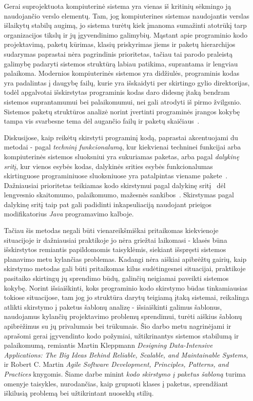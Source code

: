 Gerai suprojektuota kompiuterinė sistema yra vienas iš kritinių sėkmingo ją naudojančio verslo
elementų.
Tam, jog kompiuterines sistemas naudojantis verslas išlaikytų stabilų augimą, jo sistema turėtų kiek įmanoma sumažinti
atotrūkį tarp organizacijos tikslų ir jų įgyvendinimo galimybių.
Mąstant apie programinio kodo
projektavimą, paketų kūrimas, klasių priskyrimas jiems ir paketų hierarchijos sudarymas paprastai
nėra pagrindinis prioritetas, tačiau tai parodo praleistą galimybę padaryti sistemos struktūrą labiau
patikima, suprantama ir lengviau palaikoma.
Modernios kompiuterinės sistemos yra didžiulės, programinis kodas yra padalintas į daugybę failų,
kurie yra išskaidyti per skirtingo gylio direktorijas, todėl apgalvotai išskirstytas programinis
kodas daro didesnę įtaką bendram sistemos suprantamumui bei palaikomumui, nei gali atrodyti iš pirmo žvilgsnio.
Sistemos paketų struktūros analizė norint įvertinti programinės įrangos kokybę
tampa vis svarbesne tema dėl augančio failų ir paketų skaičiaus~\cite{DesignMetrics}.

Diskusijose, kaip reikėtų skirstyti programinį kodą, paprastai akcentuojami du metodai - pagal \textit{techninį funkcionalumą},
kur kiekvienai techninei funkcijai arba kompiuterinės sistemos sluoksniui yra sukuriamas paketas,
arba pagal \textit{dalykinę sritį}, kur vienos esybės kodas, dalykinės srities
esybės funkcionalumas skirtinguose programiniuose sluoksniuose yra patalpintas viename pakete~\cite{PackagingWays}.
Dažniausiai prioritetas teikiamas kodo skirstymui pagal dalykinę sritį~\cite{DomainDrivenDesign} dėl lengvesnio skaitomumo,
palaikomumo, mažesnės sankibos~\cite{DivideByDomain}.
Skirstymas pagal dalykinę sritį taip pat gali padidinti
inkapsuliaciją naudojant prieigos modifikatorius \textit{Java} programavimo kalboje.

Tačiau šis metodas negali būti vienareikšmiškai pritaikomas kiekvienoje situacijoje ir dažniausiai praktikoje jo nėra griežtai laikomasi -
klasės būna išskirstytos remiantis papildomomis taisyklėmis,
siekiant išspręsti sistemos planavimo metu kylančias problemas.
Kadangi nėra aiškiai apibrėžtų gairių, kaip skirstymo metodas gali būti pritaikomas kilus sudėtingesnei situacijai, praktikoje pasitaiko skirtingų
jų sprendimo būdų, galinčių neigiamai paveikti sistemos kokybę.
Norint išsiaiškinti, koks programinio kodo skirstymo būdas tinkamiausias tokiose situacijose,
tam jog jo struktūra darytų teigiamą įtaką sistemai, reikalinga atlikti skirstymo į paketus šablonų analizę -
išsiaiškinti galimus šablonus, naudojamus kylančių projektavimo problemų sprendimui, turėti aiškius šablonų apibrėžimus su jų
privalumais bei trūkumais.
Šio darbo metu nagrinėjami ir aprašomi gerai įgyvendinto kodo požymiai, užtikrinantys
sistemos stabilumą ir palaikomumą, remiantis Martin Kleppmann \textit{Designing Data-Intensive Applications: The Big Ideas Behind Reliable, Scalable, and Maintainable Systems},
ir Robert C. Martin \textit{Agile Software Development, Principles, Patterns, and Practices} knygomis.
Šiame darbe minint \textit{kodo skirstymo į paketus šabloną} turima omenyje taisykles,
nurodančias, kaip grupuoti klases į paketus, sprendžiant iškilusią problemą bei užtikrintant nuoseklų stilių.

